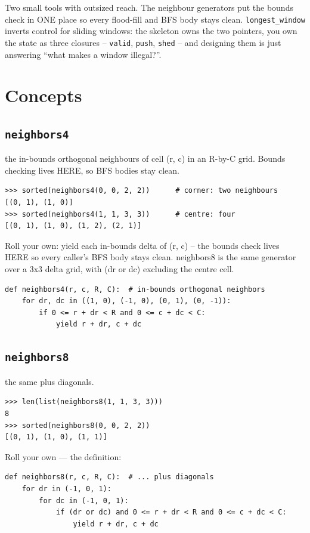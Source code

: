 \documentclass[10pt,letterpaper]{book}
\begin{document}
Two small tools with outsized reach. The neighbour generators put the
bounds check in ONE place so every flood-fill and BFS body stays clean.
\texttt{longest\_window} inverts control for sliding windows: the skeleton
owns the two pointers, you own the state as three closures --
\texttt{valid}, \texttt{push}, \texttt{shed} -- and designing them is just
answering ``what makes a window illegal?''.
\section{Concepts}
\subsection{\texttt{neighbors4}}\label{def:neighbors4}
the in-bounds orthogonal neighbours of cell (r, c) in an R-by-C grid. Bounds checking lives HERE, so BFS bodies stay clean.
\begin{lstlisting}[style=ex]
>>> sorted(neighbors4(0, 0, 2, 2))      # corner: two neighbours
[(0, 1), (1, 0)]
>>> sorted(neighbors4(1, 1, 3, 3))      # centre: four
[(0, 1), (1, 0), (1, 2), (2, 1)]
\end{lstlisting}

Roll your own: yield each in-bounds delta of (r, c) -- the bounds check lives HERE so every caller's BFS body stays clean. neighbors8 is the same generator over a 3x3 delta grid, with (dr or dc) excluding the centre cell.

\begin{lstlisting}[style=ex]
def neighbors4(r, c, R, C):  # in-bounds orthogonal neighbors
    for dr, dc in ((1, 0), (-1, 0), (0, 1), (0, -1)):
        if 0 <= r + dr < R and 0 <= c + dc < C:
            yield r + dr, c + dc
\end{lstlisting}
\subsection{\texttt{neighbors8}}\label{def:neighbors8}
the same plus diagonals.
\begin{lstlisting}[style=ex]
>>> len(list(neighbors8(1, 1, 3, 3)))
8
>>> sorted(neighbors8(0, 0, 2, 2))
[(0, 1), (1, 0), (1, 1)]
\end{lstlisting}

Roll your own --- the definition:

\begin{lstlisting}[style=ex]
def neighbors8(r, c, R, C):  # ... plus diagonals
    for dr in (-1, 0, 1):
        for dc in (-1, 0, 1):
            if (dr or dc) and 0 <= r + dr < R and 0 <= c + dc < C:
                yield r + dr, c + dc
\end{lstlisting}
\end{document}
